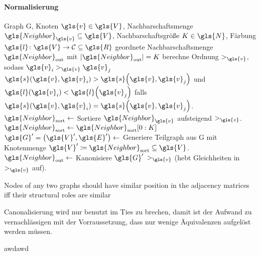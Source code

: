 \paragraph{Normalisierung}
\label{normalisierung}

\begin{algorithm}[t]
\centering
\begin{algorithmic}
  \REQUIRE{} Graph \gls{G}, Knoten $\gls{v} \in \gls{V}$, Nachbarschaftsmenge $\gls{Neighbor}_{\gls{v}} \subseteq \gls{V}$, Nachbarschaftsgröße $K \in \gls{N}$, Färbung $\gls{l} \colon \gls{V} \to \mathcal{C} \subseteq \gls{R}$
  \ENSURE{} geordnete Nachbarschaftsmenge $\gls{Neighbor}_{\mathrm{out}}$ mit $\left|\gls{Neighbor}_{\mathrm{out}}\right| = K$
  \STATE{} berechne Ordnung $>_{\gls{v}}$, sodass $\gls{v}_i >_{\gls{v}} \gls{v}_j$ \gdw{} $\gls{s}\left(\gls{v}, \gls{v}_i\right) > \gls{s}\left(\gls{v}, \gls{v}_j\right)$ und $\gls{l}\left(\gls{v}_i\right) < \gls{l}\left(\gls{v}_j\right)$ falls $\gls{s}\left(\gls{v}, \gls{v}_i\right) = \gls{s}\left(\gls{v}, \gls{v}_j\right)$.
  \STATE{} $\gls{Neighbor}_{\mathrm{sort}} \leftarrow$ Sortiere $\gls{Neighbor}_{\gls{v}}$ aufsteigend \bzgl{} $>_{\gls{v}}$.
    \STATE{} $\gls{Neighbor}_{\mathrm{sort}} \leftarrow \gls{Neighbor}_{\mathrm{sort}}\left[0:K\right]$
  \ENDIF{}
  \STATE{} $\gls{G}^{\prime} = \left(\gls{V}^{\prime}, \gls{E}^{\prime}\right) \leftarrow$ Generiere Teilgraph aus \gls{G} mit Knotenmenge $\gls{V}^{\prime} \coloneqq \gls{Neighbor}_{\mathrm{sort}} \subseteq \gls{V}$.
  \STATE{} $\gls{Neighbor}_{\mathrm{out}} \leftarrow$ Kanonisiere $\gls{G}^{\prime}$ \bzgl{} $>_{\gls{v}}$ (hebt Gleichheiten in $>_{\gls{v}}$ auf).
\end{algorithmic}
\caption[Normalisierung]{}
\label{alg:normalisierung}
\end{algorithm}



Nodes of any two graphs should have similar position in the
adjacency matrices iff their structural roles are similar

Canonalisierung wird nur benutzt im Ties zu brechen, damit ist der Aufwand zu vernachlässigen mit der Vorraussetzung, dass nur wenige Äquivalenzen aufgelöst werden müssen.

awdawd
